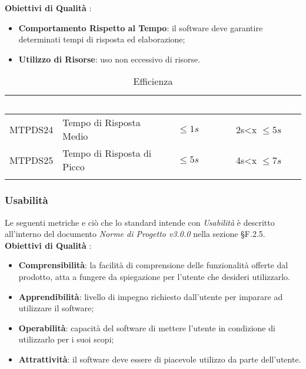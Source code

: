 \textbf{Obiettivi di Qualità} :

\begin{itemize}
	\item \textbf{Comportamento Rispetto al Tempo}: il software deve garantire determinati tempi di risposta ed elaborazione;
	\item \textbf{Utilizzo di Risorse}: uso non eccessivo di risorse.
\end{itemize}

\begin{longtable}{|C{.15\textwidth}|C{.24\textwidth}|C{.24\textwidth}|C{.24\textwidth}|}
\hline
{}\textbf{\textcolor{white}{ID}} & \textbf{\textcolor{white}{Nome}} & \textbf{\textcolor{white}{Ottimalità}} & \textbf{\textcolor{white}{Accettabilità}}\\
\hline
MTPDS24 & Tempo di Risposta Medio & $\leq 1s$ & 2s<x $\leq 5s$\\
\hline
{}MTPDS25 & Tempo di Risposta di Picco  & $\leq 5s$ & 4s<x $\leq 7s$ \\ 
\hline
\caption{Efficienza}
\label{Efficienza}
\end{longtable}



\subsubsection{Usabilità}

Le seguenti metriche e ciò che lo standard intende con \textit{Usabilità} è descritto all'interno del documento \textit{Norme di Progetto v3.0.0} nella sezione §F.2.5. \\

\textbf{Obiettivi di Qualità} :

\begin{itemize}
	\item \textbf{Comprensibilità}: la facilità di comprensione delle funzionalità offerte dal prodotto, atta a fungere da spiegazione per l'utente che desideri utilizzarlo. 
	\item \textbf{Apprendibilità}: livello di impegno richiesto dall'utente per imparare ad utilizzare il software;
	\item \textbf{Operabilità}: capacità del software di mettere l'utente in condizione di utilizzarlo per i suoi scopi; 
	\item \textbf{Attrattività}: il software deve essere di piacevole utilizzo da parte dell'utente.
\end{itemize}

